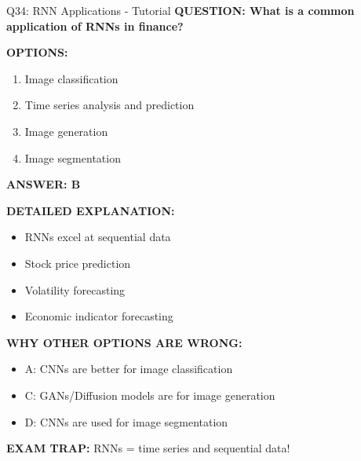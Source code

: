 \documentclass[8pt]{beamer}
\begin{document}
	\begin{frame}{Q34: RNN Applications - Tutorial}
		\fontsize{6.5}{7.5}\selectfont
		\textbf{QUESTION: What is a common application of RNNs in finance?}
		
		\vspace{0.1cm}
		\textbf{OPTIONS:}
		\begin{enumerate}
			\item Image classification
			\item Time series analysis and prediction
			\item Image generation
			\item Image segmentation
		\end{enumerate}
		
		\vspace{0.1cm}
		\textcolor{myblue}{\textbf{ANSWER: B}}
		
		\vspace{0.1cm}
		\textbf{DETAILED EXPLANATION:}
		\begin{itemize}
			\item RNNs excel at sequential data
			\item Stock price prediction
			\item Volatility forecasting
			\item Economic indicator forecasting
		\end{itemize}
		
		\vspace{0.1cm}
		\textcolor{myred}{\textbf{WHY OTHER OPTIONS ARE WRONG:}}
		\begin{itemize}
			\item \textcolor{myred}{A:} CNNs are better for image classification
			\item \textcolor{myred}{C:} GANs/Diffusion models are for image generation
			\item \textcolor{myred}{D:} CNNs are used for image segmentation
		\end{itemize}
		
		\textcolor{myred}{\textbf{EXAM TRAP:}} RNNs = \textcolor{myblue}{time series and sequential data}!
	\end{frame}
	
\end{document}
